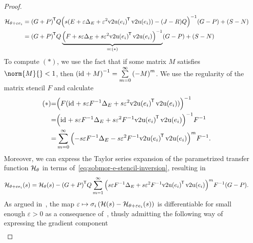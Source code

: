 \begin{proof}
\begin{equation}
\begin{aligned}
            \mathcal{H}_{\theta + \varepsilon e_i} &= {(G + P)}^{\mkern-1.5mu \mathsf{T}} Q {\left( s (E + \varepsilon \Delta_E + \varepsilon^2 {\mathop{}\!\mathrm{v}2\mathrm{u}(e_i)}^{\mkern-1.5mu \mathsf{T}} \mathop{}\!\mathrm{v}2\mathrm{u}(e_i)) - (J - R) Q \right)}^{-1} (G - P) + (S - N) \\
             &= {(G + P)}^{\mkern-1.5mu \mathsf{T}} Q \underbrace{{\left( F + s \varepsilon \Delta_E + s \varepsilon^2 {\mathop{}\!\mathrm{v}2\mathrm{u}(e_i)}^{\mkern-1.5mu \mathsf{T}} \mathop{}\!\mathrm{v}2\mathrm{u}(e_i) \right)}^{-1}}_{\eqqcolon (*)} (G - P) + (S - N)
        \end{aligned}
    \end{equation}
    To compute $(*)$, we use the fact that if some matrix $M$ satisfies $\norm{M}{} < 1$, then ${(\text{id}_{} + M)}^{-1} = \sum\limits_{m = 0}^\infty {(-M)}^m$.
    We use the regularity of the matrix stencil $F$ and calculate
    \begin{equation}\label{eq:sobmor-e-stencil-inversion}
        \begin{alignedat}{3}
            &(*) &= &{\left( F (\text{id}_{} + s \varepsilon F^{-1} \Delta_E + s \varepsilon^2 {\mathop{}\!\mathrm{v}2\mathrm{u}(e_i)}^{\mkern-1.5mu \mathsf{T}} \mathop{}\!\mathrm{v}2\mathrm{u}(e_i)) \right)}^{-1} \\
            & &= &{\left( \text{id}_{} + s \varepsilon F^{-1} \Delta_E + s \varepsilon^2 F^{-1} {\mathop{}\!\mathrm{v}2\mathrm{u}(e_i)}^{\mkern-1.5mu \mathsf{T}} \mathop{}\!\mathrm{v}2\mathrm{u}(e_i) \right)}^{-1} F^{-1} \\
            & &= &\sum\limits_{m = 0}^\infty {\left( - s \varepsilon F^{-1} \Delta_E - s \varepsilon^2 F^{-1} {\mathop{}\!\mathrm{v}2\mathrm{u}(e_i)}^{\mkern-1.5mu \mathsf{T}}\mathop{}\!\mathrm{v}2\mathrm{u}(e_i) \right)}^m F^{-1}.
        \end{alignedat}
    \end{equation}
    Moreover, we can express the Taylor series expansion of the parametrized transfer function $\mathcal{H}_\theta$ in terms of~\eqref{eq:sobmor-e-stencil-inversion}, resulting in
    \begin{equation}\label{eq:sobmor-e-taylor}
        \mathcal{H}_{\theta + \varepsilon e_i}(s) = \mathcal{H}_\theta(s) - {(G + P)}^{\mkern-1.5mu \mathsf{T}} Q \sum\limits_{m = 1}^\infty {\left( s \varepsilon F^{-1} \Delta_E + s \varepsilon^2 F^{-1} {\mathop{}\!\mathrm{v}2\mathrm{u}(e_i)}^{\mkern-1.5mu \mathsf{T}}\mathop{}\!\mathrm{v}2\mathrm{u}(e_i) \right)}^m F^{-1} (G - P).
    \end{equation}
    As argued in~\cite[Theorem~1]{Schwerdtner2022}, the map $\varepsilon \mapsto \sigma_i\left( \mathcal{H}(s) - \mathcal{H}_{\theta + \varepsilon e_i}(s) \right)$ is differentiable for small enough $\varepsilon > 0$ as a consequence of~\cite{Lancaster1964}, thusly admitting the following way of expressing the gradient component
    \begin{equation}\label{eq:sobmor-e-trace-form}
        \begin{aligned}

\end{aligned}
\end{equation}
\end{proof}
